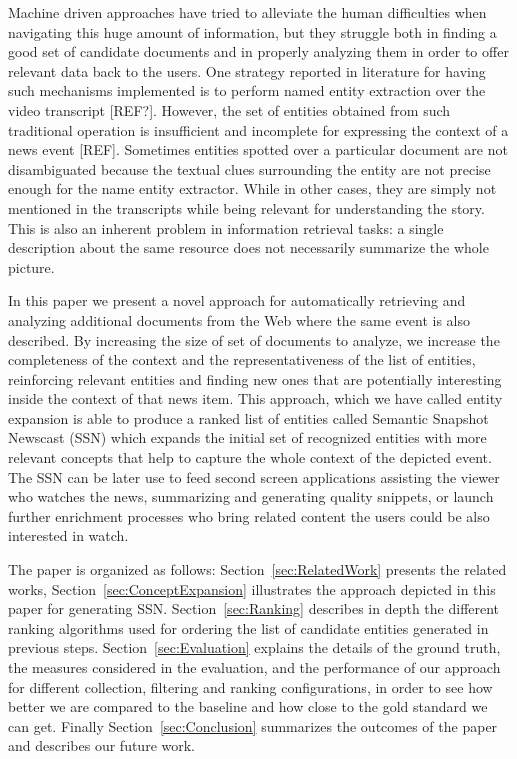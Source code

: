 \documentclass{llncs}
\newcommand{\todo}[1]{\colorbox{red}{#1}}
\begin{document}
Machine driven approaches have tried to alleviate the human difficulties when navigating this huge amount of information, but they struggle both in finding a good set of candidate documents and in properly analyzing them in order to offer relevant data back to the users. One strategy reported in literature for having such mechanisms implemented is to perform named entity extraction over the video transcript [REF?]. However, the set of entities obtained from such traditional operation is insufficient and incomplete for expressing the context of a news event  [REF]. Sometimes entities spotted over a particular document are not disambiguated because the textual clues surrounding the entity are not precise enough for the name entity extractor. While in other cases, they are simply not mentioned in the transcripts while being relevant for understanding the story. This is also an inherent problem in information retrieval tasks: a single description about the same resource does not necessarily summarize the whole picture. 

In this paper we present a novel approach for automatically retrieving and analyzing additional documents from the Web where the same event is also described. By increasing the size of set of documents to analyze, we increase the completeness of the context and the representativeness of the list of entities, reinforcing relevant entities and finding new ones that are potentially interesting inside the context of that news item. This approach, which we have called entity expansion is able to produce a ranked list of entities called  Semantic Snapshot Newscast (SSN) which expands the initial set of recognized entities with more relevant concepts that help to capture the whole context of the depicted event. The SSN can be later use to feed second screen applications assisting the viewer who watches the news, summarizing and generating quality snippets, or launch further  enrichment processes who bring related content the users could be also interested in watch. 

The paper is organized as follows: Section~\ref{sec:RelatedWork} presents the related works, Section~\ref{sec:ConceptExpansion} illustrates the approach depicted in this paper for generating SSN.
Section~\ref{sec:Ranking} describes in depth the different ranking algorithms used for ordering the list of candidate entities generated in previous steps. Section~\ref{sec:Evaluation} explains the details of the ground truth, the measures considered in the evaluation, and the performance of our approach for different collection, filtering and ranking configurations, in order to see how better we are compared to the baseline and how close to the gold standard we can get. Finally Section~\ref{sec:Conclusion} summarizes the outcomes of the paper and describes our future work.
\end{document}
